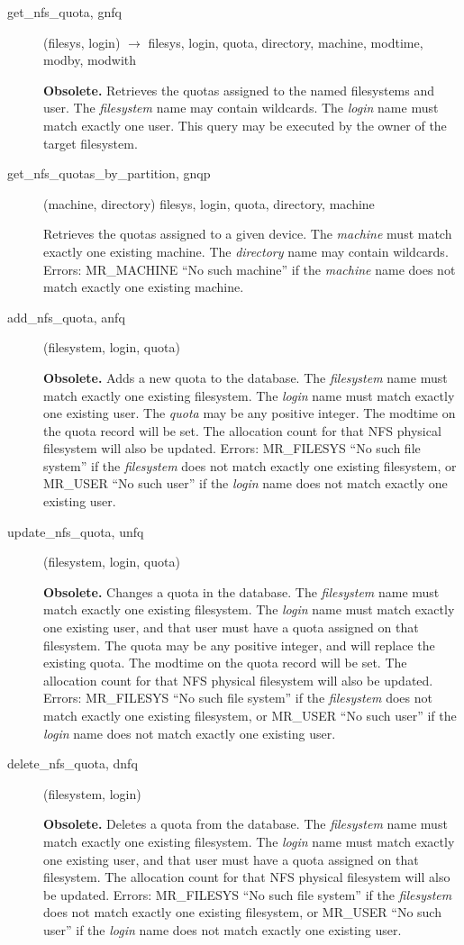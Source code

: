 \documentclass{article}
\begin{document}
\begin{description}
\item[get\_nfs\_quota, gnfq](filesys, login) $\rightarrow$ filesys,
login, quota, directory, machine, modtime, modby, modwith

{\bf Obsolete.}
Retrieves the quotas assigned to the named filesystems and user.  The
{\em filesystem} name may contain wildcards.  The {\em login} name must
match exactly one user.  This query may be executed by the owner of
the target filesystem.

\item[get\_nfs\_quotas\_by\_partition, gnqp](machine, directory)
filesys, login, quota, directory, machine

Retrieves the quotas assigned to a given device.  The {\em machine} must
match exactly one existing machine.  The {\em directory} name may
contain wildcards.  Errors: MR\_MACHINE ``No such machine'' if the
{\em machine} name does not match exactly one existing machine.

\item[add\_nfs\_quota, anfq](filesystem, login, quota)

{\bf Obsolete.}
Adds a new quota to the database.  The {\em filesystem} name must match
exactly one existing filesystem.  The {\em login} name must match
exactly one existing user.  The {\em quota} may be any positive
integer.  The modtime on the quota record will be set.  The allocation
count for that NFS physical filesystem will also be updated.  Errors:
MR\_FILESYS ``No such file system'' if the {\em filesystem} does not match
exactly one existing filesystem, or MR\_USER ``No such user'' if the
{\em login} name does not match exactly one existing user.

\item[update\_nfs\_quota, unfq](filesystem, login, quota)

{\bf Obsolete.}
Changes a quota in the database.  The {\em filesystem} name must match
exactly one existing filesystem.  The {\em login} name must match
exactly one existing user, and that user must have a quota assigned on
that filesystem.  The quota may be any positive integer, and will
replace the existing quota.  The modtime on the quota record will be
set.  The allocation count for that NFS physical filesystem will also
be updated.  Errors: MR\_FILESYS ``No such file system'' if the
{\em filesystem} does not match exactly one existing filesystem, or
MR\_USER ``No such user'' if the {\em login} name does not match exactly
one existing user.

\item[delete\_nfs\_quota, dnfq](filesystem, login)

{\bf Obsolete.}
Deletes a quota from the database.  The {\em filesystem} name must match
exactly one existing filesystem.  The {\em login} name must match
exactly one existing user, and that user must have a quota assigned on
that filesystem.  The allocation count for that NFS physical
filesystem will also be updated.  Errors: MR\_FILESYS ``No such file
system'' if the {\em filesystem} does not match exactly one existing
filesystem, or MR\_USER ``No such user'' if the {\em login} name does not
match exactly one existing user.

\end{description}
\end{document}
